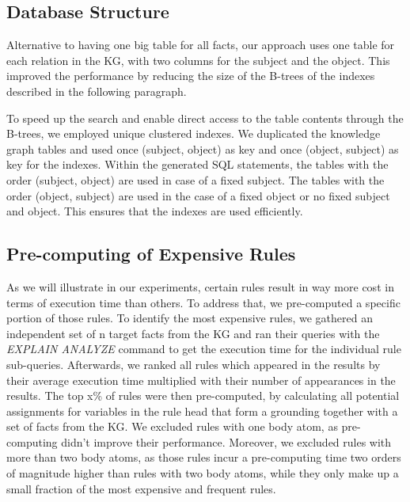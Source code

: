 \documentclass[english]{lni}
\begin{document}
\subsection{Database Structure}
Alternative to having one big table for all facts, our approach uses one table for each relation in the KG, with two columns for the subject and the object. This improved the performance by reducing the size of the B-trees of the indexes described in the following paragraph.

To speed up the search and enable direct access to the table contents through the B-trees, we employed unique clustered indexes. We duplicated the knowledge graph tables and used once (subject, object) as key and once (object, subject) as key for the indexes. Within the generated SQL statements, the tables with the order (subject, object) are used in case of a fixed subject. The tables with the order (object, subject) are used in the case of a fixed object or no fixed subject and object. This ensures that the indexes are used efficiently.

\subsection{Pre-computing of Expensive Rules}
\label{pre-computation}
As we will illustrate in our experiments, certain rules result in way more cost in terms of execution time than others. To address that, we pre-computed a specific portion of those rules. To identify the most expensive rules, we gathered an independent set of n target facts from the KG and ran their queries with the \textit{EXPLAIN ANALYZE} command to get the execution time for the individual rule sub-queries. Afterwards, we ranked all rules which appeared in the results by their average execution time multiplied with their number of appearances in the results. The top x\% of rules were then pre-computed, by calculating all potential assignments for variables in the rule head that form a grounding together with a set of facts from the KG. We excluded rules with one body atom, as pre-computing didn’t improve their performance. Moreover, we excluded rules with more than two body atoms, as those rules incur a pre-computing time two orders of magnitude higher than rules with two body atoms, while they only make up a small fraction of the most expensive and frequent rules.
\end{document}
